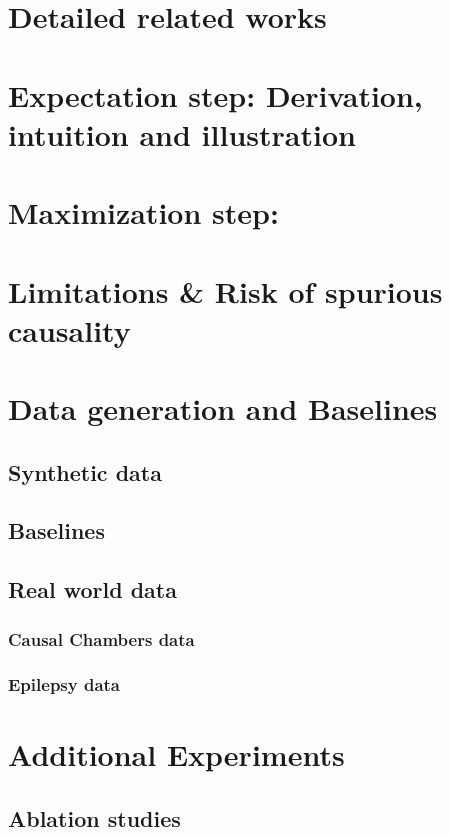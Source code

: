 \documentclass{article}
\theoremstyle{plain}
\theoremstyle{definition}
\theoremstyle{remark}
\begin{document}
\section{Detailed related works}
\label{detaled_related}

\section{Expectation step: Derivation, intuition and illustration}
\label{Estep_illustration}

\section{Maximization step:}
\label{Mstep_bayesian_details}

\section{Limitations \& Risk of spurious causality}
\label{limitations}

\section{Data generation and Baselines}
\subsection{Synthetic data}
\label{synthetic_data_gen}

\subsection{Baselines}
\label{baselines}

\subsection{Real world data}
\subsubsection{Causal Chambers data}
\label{causal_chambers}

\subsubsection{Epilepsy data}
\label{epilepsy_data}

\section{Additional Experiments}
\label{additional_exp}
\subsection{Ablation studies}
\label{ablation}

\end{document}
